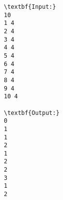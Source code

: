 \begin{verbatim}
\textbf{Input:}
10
1 4
2 4
3 4
4 4
5 4
6 4
7 4
8 4
9 4
10 4

\textbf{Output:}
0
1
1
2
1
2
2
3
1
2
\end{verbatim}